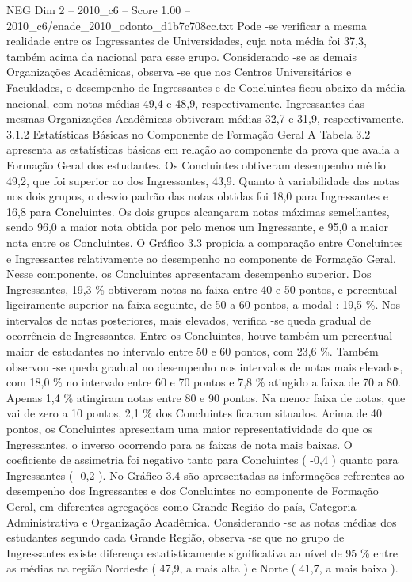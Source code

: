 \begin{textsample}{NEG Dim 2 – 2010\_c6 – Score 1.00 – 2010\_c6/enade\_2010\_odonto\_d1b7c708cc.txt}
Pode -se verificar a mesma realidade entre os Ingressantes de Universidades, cuja nota média foi 37,3, também acima da nacional para esse grupo.
Considerando -se as demais Organizações Acadêmicas, observa -se que nos Centros Universitários e Faculdades, o desempenho de Ingressantes e de Concluintes ficou abaixo da média nacional, com notas médias 49,4 e 48,9, respectivamente.
Ingressantes das mesmas Organizações Acadêmicas obtiveram médias 32,7 e 31,9, respectivamente. 3.1.2 Estatísticas Básicas no Componente de Formação Geral A Tabela 3.2 apresenta as estatísticas básicas em relação ao componente da prova que avalia a Formação Geral dos estudantes.
Os Concluintes obtiveram desempenho médio 49,2, que foi superior ao dos Ingressantes, 43,9.
Quanto à variabilidade das notas nos dois grupos, o desvio padrão das notas obtidas foi 18,0 para Ingressantes e 16,8 para Concluintes.
Os dois grupos alcançaram notas máximas semelhantes, sendo 96,0 a maior nota obtida por pelo menos um Ingressante, e 95,0 a maior nota entre os Concluintes.
O Gráfico 3.3 propicia a comparação entre Concluintes e Ingressantes relativamente ao desempenho no componente de Formação Geral.
Nesse componente, os Concluintes apresentaram desempenho superior.
Dos Ingressantes, 19,3 \% obtiveram notas na faixa entre 40 e 50 pontos, e percentual ligeiramente superior na faixa seguinte, de 50 a 60 pontos, a modal : 19,5 \%.
Nos intervalos de notas posteriores, mais elevados, verifica -se queda gradual de ocorrência de Ingressantes.
Entre os Concluintes, houve também um percentual maior de estudantes no intervalo entre 50 e 60 pontos, com 23,6 \%.
Também observou -se queda gradual no desempenho nos intervalos de notas mais elevados, com 18,0 \% no intervalo entre 60 e 70 pontos e 7,8 \% atingido a faixa de 70 a 80.
Apenas 1,4 \% atingiram notas entre 80 e 90 pontos.
Na menor faixa de notas, que vai de zero a 10 pontos, 2,1 \% dos Concluintes ficaram situados.
Acima de 40 pontos, os Concluintes apresentam uma maior representatividade do que os Ingressantes, o inverso ocorrendo para as faixas de nota mais baixas.
O coeficiente de assimetria foi negativo tanto para Concluintes ( -0,4 ) quanto para Ingressantes ( -0,2 ).
No Gráfico 3.4 são apresentadas as informações referentes ao desempenho dos Ingressantes e dos Concluintes no componente de Formação Geral, em diferentes agregações como Grande Região do país, Categoria Administrativa e Organização Acadêmica.
Considerando -se as notas médias dos estudantes segundo cada Grande Região, observa -se que no grupo de Ingressantes existe diferença estatisticamente significativa ao nível de 95 \% entre as médias na região Nordeste ( 47,9, a mais alta ) e Norte ( 41,7, a mais baixa ).

\end{textsample}
